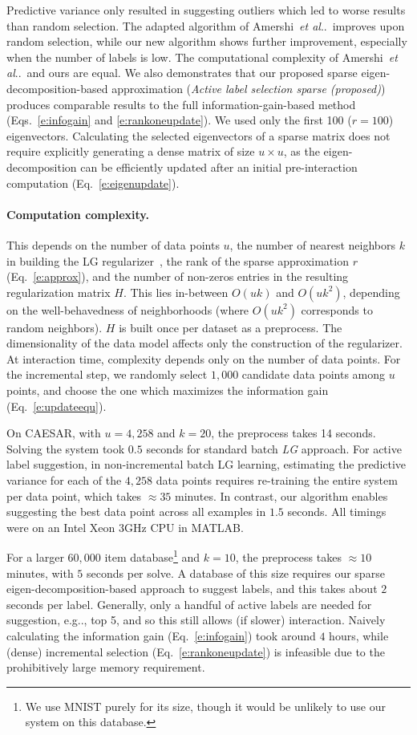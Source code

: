 \documentclass{article}
\makeatletter
\DeclareRobustCommand\onedot{\futurelet\@let@token\@onedot}
\def\@onedot{\ifx\@let@token.\else.\null\fi\xspace}
\def\eg{{e.g}\onedot} \def\Eg{{E.g}\onedot}
\def\etal{\emph{et al}\onedot}
\makeatother
\begin{document}
Predictive variance only resulted in suggesting outliers which led to worse results than random selection. The adapted algorithm of Amershi~\etal~improves upon random selection, while our new algorithm shows further improvement, especially when the number of labels is low. The computational complexity of Amershi~\etal~and ours are equal. We also demonstrates that our proposed sparse eigen-decomposition-based approximation (\emph{Active label selection sparse (proposed)}) produces comparable results to the full information-gain-based method (Eqs.~\ref{e:infogain} and \ref{e:rankoneupdate}). We used only the first 100 ($r=100$) eigenvectors. Calculating the selected eigenvectors of a sparse matrix does not require explicitly generating a dense matrix of size $u\times u$, as the eigen-decomposition can be efficiently updated after an initial pre-interaction computation (Eq.~\ref{e:eigenupdate}).


\paragraph{Computation complexity.}
This depends on the number of data points $u$, the number of nearest neighbors $k$ in building the LG regularizer~\cite{KimTompkin2015}, the rank of the sparse approximation $r$ (Eq.~\ref{e:approx}), and the number of non-zeros entries in the resulting regularization matrix $H$. This lies in-between $O(uk)$ and $O(uk^2)$, depending on the well-behavedness of neighborhoods (where $O(uk^2)$ corresponds to random neighbors). $H$ is built once per dataset as a preprocess. The dimensionality of the data model affects only the construction of the regularizer. At interaction time, complexity depends only on the number of data points. For the incremental step, we randomly select $1,000$ candidate data points among $u$ points, and choose the one which maximizes the information gain (Eq.~\ref{e:updateequ}). 

On CAESAR, with $u=4,258$ and $k=20$, the preprocess takes 14 seconds. Solving the system took $0.5$ seconds for standard batch \emph{LG} approach. For active label suggestion, in non-incremental batch LG learning, estimating the predictive variance for each of the $4,258$ data points requires re-training the entire system per data point, which takes $\approx 35$ minutes. In contrast, our algorithm enables suggesting the best data point across all examples in $1.5$ seconds. All timings were on an Intel Xeon 3GHz CPU in MATLAB.

For a larger $60,000$ item database\footnote{We use MNIST purely for its size, though it would be unlikely to use our system on this database.} and $k=10$, the preprocess takes $\approx 10$ minutes, with $5$ seconds per solve. A database of this size requires our sparse eigen-decomposition-based approach to suggest labels, and this takes about $2$ seconds per label. Generally, only a handful of active labels are needed for suggestion, \eg, top 5, and so this still allows (if slower) interaction. Naively calculating the information gain (Eq.~\ref{e:infogain}) took around $4$ hours, while (dense) incremental selection (Eq.~\ref{e:rankoneupdate}) is infeasible due to the prohibitively large memory requirement.
\end{document}
